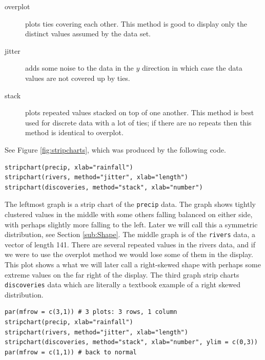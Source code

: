 \documentclass[captions=tableheading]{scrbook}
\begin{document}
\begin{description}
\item[overplot] plots ties covering each other. This method is good to display only the distinct values assumed by the data set.
\item[jitter] adds some noise to the data in the \(y\) direction in which case the data values are not covered up by ties.
\item[stack] plots repeated values stacked on top of one another. This method is best used for discrete data with a lot of ties; if there are no repeats then this method is identical to overplot.
\end{description}

See Figure \ref{fig:stripcharts}, which was produced by the following code.


\begin{verbatim}
stripchart(precip, xlab="rainfall")
stripchart(rivers, method="jitter", xlab="length")
stripchart(discoveries, method="stack", xlab="number")
\end{verbatim}

The leftmost graph is a strip chart of the \texttt{precip} data. The graph shows tightly clustered values in the middle with some others falling balanced on either side, with perhaps slightly more falling to the left. Later we will call this a symmetric distribution, see Section \ref{sub:Shape}. The middle graph is of the \texttt{rivers} data, a vector of length 141. There are several repeated values in the rivers data, and if we were to use the overplot method we would lose some of them in the display. This plot shows a what we will later call a right-skewed shape with perhaps some extreme values on the far right of the display. The third graph strip charts \texttt{discoveries} data which are literally a textbook example of a right skewed distribution.


\begin{verbatim}
par(mfrow = c(3,1)) # 3 plots: 3 rows, 1 column
stripchart(precip, xlab="rainfall")
stripchart(rivers, method="jitter", xlab="length")
stripchart(discoveries, method="stack", xlab="number", ylim = c(0,3))
par(mfrow = c(1,1)) # back to normal
\end{verbatim}
\end{document}
